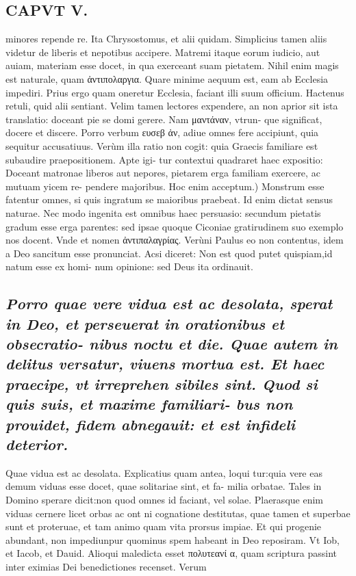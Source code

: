 \documentclass{article}
\begin{document}
\begin{pages}
\section*{CAPVT V. }
\marginpar{[ p.57 ]}\pstart minores repende re. Ita Chrysostomus, et alii quidam. Simplicius tamen aliis videtur de liberis et nepotibus accipere. Matremi itaque eorum iudicio, aut auiam, materiam esse docet, in qua exerceant suam pietatem. Nihil enim magis est naturale, quam ἀντιπολαργια. Quare minime aequum est, eam ab Ecclesia impediri. Prius ergo quam oneretur Ecclesia, faciant illi suum officium. Hactenus retuli, quid alii sentiant. Velim tamen lectores expendere, an non aprior sit ista translatio: doceant pie se domi gerere. Nam μαντάναν, vtrun- que significat, docere et discere. Porro verbum ευσεβ ἀν, adiue omnes fere accipiunt, quia sequitur accusatiuus. Verùm illa ratio non cogit: quia Graecis familiare est subaudire praepositionem. Apte igi- tur contextui quadraret haec expositio: Doceant matronae liberos aut nepores, pietarem erga familiam exercere, ac mutuam yicem re- pendere majoribus.  \pend\pstart Hoc enim acceptum.) Monstrum esse fatentur omnes, si quis ingratum se maioribus praebeat. Id enim dictat sensus naturae. Nec modo ingenita est omnibus haec persuasio: secundum pietatis gradum esse erga parentes: sed ipsae quoque Ciconiae gratirudinem suo exemplo nos docent. Vnde et nomen ἀντιπαλαγρίας. Verùni Paulus eo non contentus, idem a Deo sancitum esse pronunciat. Acsi diceret: Non est quod putet quispiam,id natum esse ex homi- num opinione: sed Deus ita ordinauit.  \pend
{}
{}
\subsection*{\textit{Porro quae vere vidua est ac desolata, sperat in Deo, et perseuerat in orationibus et obsecratio- nibus noctu et die. Quae autem in delitus versatur, viuens mortua est. Et haec praecipe, vt irreprehen sibiles sint. Quod si quis suis, et maxime familiari- bus non prouidet, fidem abnegauit: et est infideli deterior. }}\pstart Quae vidua est ac desolata. Explicatius quam antea, loqui tur:quia vere eas demum viduas esse docet, quae solitariae sint, et fa- milia orbatae. Tales in Domino sperare dicit:non quod omnes id faciant, vel solae. Plaerasque enim viduas cernere licet orbas ac ont ni cognatione destitutas, quae tamen et superbae sunt et proteruae, et tam animo quam vita prorsus impiae. Et qui progenie abundant, non impediunpur quominus spem habeant in Deo reposiram. Vt Iob, et Iacob, et Dauid. Alioqui maledicta esset πολυτεανί α, quam scriptura passint inter eximias Dei benedictiones recenset. Verum  \pend

\end{pages}
\end{document}
